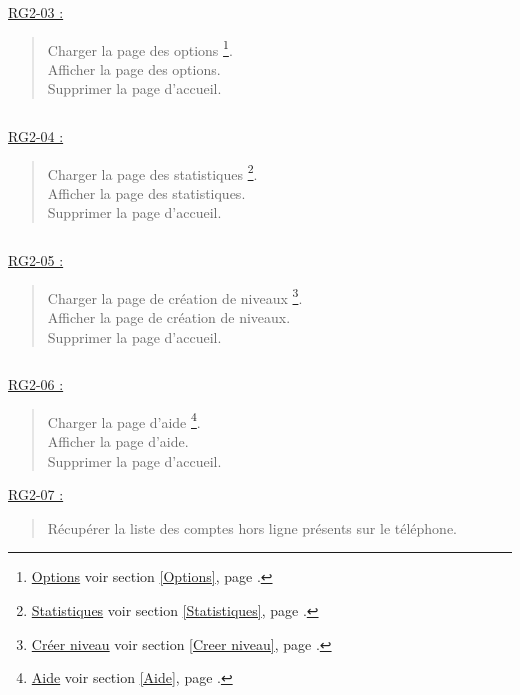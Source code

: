 \documentclass{report}
\begin{document}
		$\,$
		
		\underline{RG2-03 :}
			\begin{quote}
				Charger la page des options%
					\footnote{
						\hyperlink{Options}{Options}
						\og voir section \ref{Options}, page \pageref{Options}.\fg
					}.\\
				Afficher la page des options\footnotemark[5].\\
				Supprimer la page d'accueil\footnotemark[2].
			\end{quote}


		$\,$

		\underline{RG2-04 :}
			\begin{quote}
				Charger la page des statistiques%
					\footnote{
						\hyperlink{Statistiques}{Statistiques}
						\og voir section \ref{Statistiques}, page \pageref{Statistiques}.\fg
					}.\\
				Afficher la page des statistiques\footnotemark[6].\\
				Supprimer la page d'accueil\footnotemark[2].
			\end{quote}

		$\,$

		\underline{RG2-05 :}
			\begin{quote}
				Charger la page de création de niveaux%
					\footnote{
						\hyperlink{Creer niveau}{Créer niveau}
						\og voir section \ref{Creer niveau}, page \pageref{Creer niveau}.\fg
					}.\\
				Afficher la page de création de niveaux\footnotemark[7].\\
				Supprimer la page d'accueil\footnotemark[2].		
			\end{quote}

		$\,$

		\underline{RG2-06 :}
			\begin{quote}
				Charger la page d'aide%
					\footnote{
						\hyperlink{Aide}{Aide}
						\og voir section \ref{Aide}, page \pageref{Aide}.\fg
					}.\\
				Afficher la page d'aide\footnotemark[8].\\
				Supprimer la page d'accueil\footnotemark[2].\\		
			\end{quote}
			
			
		\underline{RG2-07 :}
			\begin{quote}
				Récupérer la liste des comptes hors ligne présents sur le téléphone.\\
			\end{quote}
\end{document}
